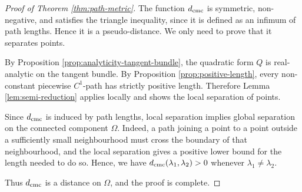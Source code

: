 \documentclass[11pt]{amsart}
\theoremstyle{plain}
\theoremstyle{definition}
\theoremstyle{remark}
\begin{document}
\begin{proof}[Proof of Theorem \ref{thm:path-metric}]
The function $d_{\rm cmc}$ is 
symmetric, non-negative, and
satisfies the triangle inequality, since it is defined as an infimum of path
lengths. Hence it is a pseudo-distance. We only need to prove that it separates
points.

By Proposition \ref{prop:analyticity-tangent-bundle}, the quadratic form $Q$ is real-analytic on the tangent
bundle. By Proposition \ref{prop:positive-length}, every non-constant piecewise $C^1$-path has
strictly positive length. Therefore Lemma \ref{lem:semi-reduction}
applies locally and shows 
the local separation of points.

Since $d_{\rm cmc}$ is induced by path lengths, local separation implies global separation on the connected component $\Omega$. Indeed, a path joining a point to a point outside a sufficiently small neighbourhood must cross the boundary of that neighbourhood, and the local separation gives a positive lower bound for the length needed to do so. Hence, we have $d_{\rm cmc}(\lambda_1,\lambda_2)>0$ whenever $\lambda_1\neq\lambda_2$.

Thus $d_{\rm cmc}$ is a distance on $\Omega$, and the proof is complete.
\end{proof}



\printbibliography
\end{document}
